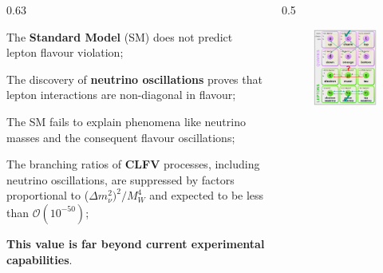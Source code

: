 \documentclass{beamer}
\begin{document}
\begin{frame}
\begin{columns}
\begin{column}{0.63\framewidth}
        \begin{itemize}
     {\footnotesize     \item The \textbf{Standard Model} (SM) does not predict lepton flavour violation;
            \vspace{3mm}
            \item The discovery of \textbf{neutrino oscillations} proves that lepton interactions are non-diagonal in flavour; \textcolor{white}{\cite{Bernstein_2013} \cite{Kargiantoulakis_2020} \cite{universe9010054}}
            \vspace{3mm}
            \item The SM fails to explain phenomena like neutrino masses and the consequent flavour oscillations;\textcolor{white}{\cite{clfv_signorelli} \cite{bartoszek2015mu2e} \cite{bobbb} \cite{kola}}
            \vspace{3mm}
            \item The branching ratios of \textbf{CLFV}
            processes, including neutrino
            oscillations, are suppressed by factors
            proportional to ($\Delta m_\nu^2)^2 /M^4_W$ and expected to be less than $\mathcal{O}(10^{-50})$;
            \vspace{3mm}
            \item \textbf{This value is far beyond current experimental capabilities}.}  
        \end{itemize}
    \end{column}
    \begin{column}{0.5\framewidth}
        \begin{figure}[h]
            \centering
            \includegraphics[width=0.7\columnwidth]{figures/png/Screenshot_20240913_102556.png}
        \end{figure} 
        

\end{column}
\end{columns}
\end{frame}
\end{document}
